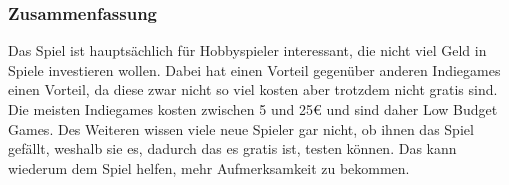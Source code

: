 \subsubsection{Zusammenfassung}\label{subsubsec:Zusammenfassung}
Das Spiel ist hauptsächlich für Hobbyspieler interessant, die nicht viel Geld in Spiele investieren wollen. Dabei hat \ff einen Vorteil gegenüber anderen Indiegames einen Vorteil,
da diese zwar nicht so viel kosten aber trotzdem nicht gratis sind.
Die meisten Indiegames kosten zwischen 5 und 25€ und sind daher Low Budget Games.
Des Weiteren wissen viele neue Spieler gar nicht, ob ihnen das Spiel gefällt, weshalb sie es, dadurch das es gratis ist, testen können.
Das kann wiederum dem Spiel helfen, mehr Aufmerksamkeit zu bekommen.


\renewcommand{\kapitelautor}{}
